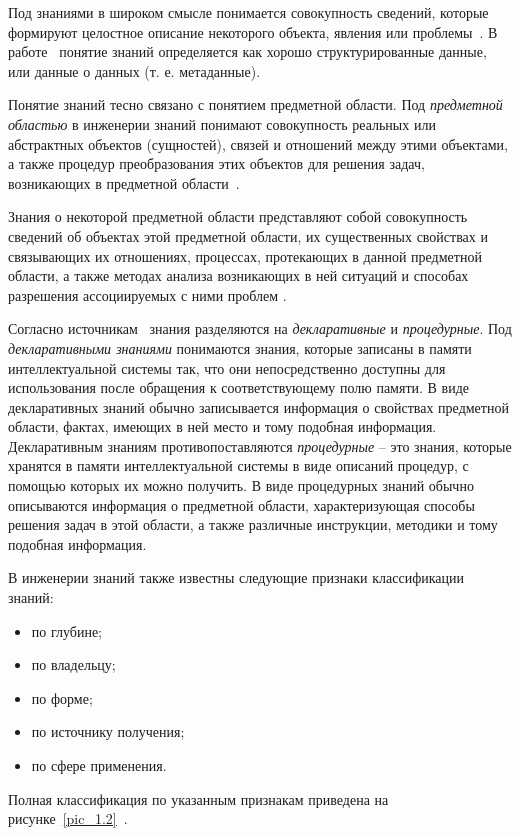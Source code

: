 Под знаниями в широком смысле понимается совокупность сведений, которые формируют целостное описание некоторого объекта, явления или проблемы~\cite{Averkin1992}. В работе~\cite{Gavrilova2001} понятие знаний определяется как хорошо структурированные данные, или данные о данных (т. е. метаданные). 

Понятие знаний тесно связано с понятием предметной области. Под \textit{предметной областью} в инженерии знаний понимают совокупность реальных или абстрактных объектов (сущностей), связей и отношений между этими объектами, а также процедур преобразования этих объектов для решения задач, возникающих в предметной области~\cite{Averkin1992}.

Знания о некоторой предметной области представляют собой совокупность сведений об объектах этой предметной области, их существенных свойствах и связывающих их отношениях, процессах, протекающих в данной предметной области, а также методах анализа возникающих в ней ситуаций и способах разрешения ассоциируемых с ними проблем \cite{Gavrilova2001}.

Согласно источникам~\cite{Averkin1992, Jong1996} знания разделяются на \textit{декларативные} и \textit{процедурные}. Под \textit{декларативными знаниями} понимаются знания, которые записаны в памяти интеллектуальной системы так, что они непосредственно доступны для использования после обращения к соответствующему полю памяти. В виде декларативных знаний обычно записывается информация о свойствах предметной области, фактах, имеющих в ней место и тому подобная информация. Декларативным знаниям противопоставляются \textit{процедурные} – это знания, которые хранятся в памяти интеллектуальной системы в виде описаний процедур, с помощью которых их можно получить. В виде процедурных знаний обычно описываются информация о предметной области, характеризующая способы решения задач в этой области, а также различные инструкции, методики и тому подобная информация.

В инженерии знаний также известны следующие признаки классификации знаний:
\begin{itemize}
  \item по глубине;
  \item по владельцу;
  \item по форме;
  \item по источнику получения;
  \item по сфере применения.
\end{itemize}

Полная классификация по указанным признакам приведена на \mbox{рисунке \ref{pic_1.2}~\cite{Gavrilova2016, Tarasov2003}.} 

